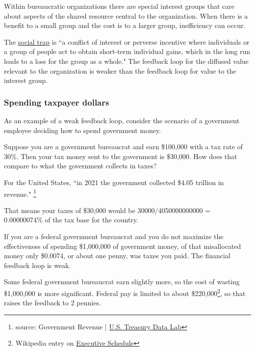 Within bureaucratic organizations there are special interest groups that care about aspects of the shared resource central to the organization. 
When there is a benefit to a small group and the cost is to a larger group, inefficiency can occur.

The \href{https://en.wikipedia.org/wiki/Social_trap}{social trap}
is ``a conflict of interest or perverse incentive where individuals or a group of people act to obtain short-term individual gains, which in the long run leads to a loss for the group as a whole."
The feedback loop for the diffused value relevant to the organization is weaker than the feedback loop for value to the interest group. 

\subsubsection*{Spending taxpayer dollars}

As an example of a weak feedback loop, consider the scenario of a government employee deciding how to spend government money.

\begin{mdframed}
Suppose you are a government bureaucrat and earn \$100,000 with a tax rate of 30\%. Then your tax money sent to the government is \$30,000.
How does that compare to what the government collects in taxes?

For the United States, ``in 2021 the government collected \$4.05 trillion in revenue."
\footnote{source: Government Revenue | \href{https://datalab.usaspending.gov/americas-finance-guide/revenue/}{U.S. Treasury Data Lab}}

That means your taxes of \$30,000 would be
30000/4050000000000 = 0.00000074\% of the tax base for the country.

If you are a federal government bureaucrat and you do not maximize the effectiveness of spending \$1,000,000 of government money, of that misallocated money only \$0.0074, or about one penny, was taxes you paid. The financial feedback loop is weak.

Some federal government bureaucrat earn slightly more, so the cost of wasting \$1,000,000 is more significant.
Federal pay is limited to about \$220,000\footnote{Wikipedia entry on \href{https://en.wikipedia.org/wiki/Executive\_Schedule}{Executive Schedule}
}, so that raises the feedback to 2 pennies.
\end{mdframed}

